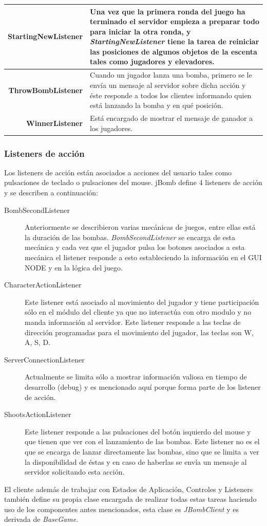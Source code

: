 \documentclass[a4paper,12pt,openany,oneside]{book}
\begin{document}
\begin{flushleft}
\begin{tabular}{|r|p{9.3cm}|}
\hline
\textbf{StartingNewListener} & Una vez que la primera ronda del juego ha terminado el servidor empieza a preparar todo para iniciar la otra ronda, y \textit{StartingNewListener} tiene la tarea de reiniciar las posiciones de algunos objetos de la escenta tales como jugadores y elevadores.\\	
\hline
\textbf{ThrowBombListener} & Cuando un jugador lanza una bomba, primero se le envía un mensaje al servidor sobre dicha acción y éste responde a todos los clientes informando quien está lanzando la bomba y en qué posición.\\	
\hline
\textbf{WinnerListener} & Está encargado de mostrar el mensaje de ganador a los jugadores. \\	
\hline
\end{tabular}
\end{flushleft}
\subsubsection{Listeners de acción}
Los listeners de acción están asociados a acciones del usuario tales como pulsaciones de teclado o pulsaciones del mouse. jBomb define 4 listeners de acción y se describen a continuación:
\begin{description}
\item[BombSecondListener] Anteriormente se describieron varias mecánicas de juegos, entre ellas está la duración de las bombas. \textit{BombSecondListener} se encarga de esta mecánica y cada vez que el jugador pulsa los botones asociados a esta mecánica el listener responde a esto estableciendo la información en el GUI NODE y en la lógica del juego.
\item[CharacterActionListener] Este listener está asociado al movimiento del jugador y tiene participación sólo en el módulo del cliente ya que no interactúa con otro modulo y no manda información al servidor. Este listener responde a las teclas de dirección programadas para el movimiento del jugador, las teclas son W, A, S, D.
\item[ServerConnectionListener] Actualmente se limita sólo a mostrar información valiosa en tiempo de desarrollo (debug) y es mencionado aquí porque forma parte de los listener de acción.
\item[ShootsActionListener] Este listener responde a las pulsaciones del botón isquierdo del mouse y que tienen que ver con el lanzamiento de las bombas. Este listener no es el que se encarga de lanzar directamente las bombas, sino que se limita a ver la disponibilidad de éstas y en caso de haberlas se envía un mensaje al servidor solicitando esta acción.
\end{description}
El cliente además de trabajar con Estados de Aplicación, Controles y Listeners también define su propia clase encargada de realizar todas estas tareas haciendo uso de los componentes antes mencionados, esta clase es \textit{JBombClient} y es derivada de \textit{BaseGame}.
\end{document}
